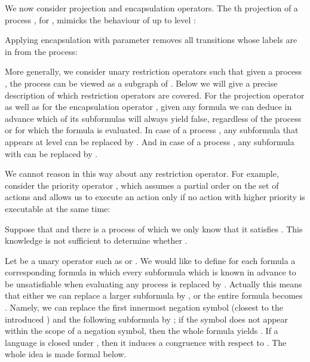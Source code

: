 \documentclass{eptcs}
\begin{document}
We now consider projection and encapsulation operators. The th projection of a process , for , mimicks the behaviour of  up to level :
\begin{center}

\end{center}
Applying encapsulation with parameter  removes all transitions whose labels are in  from the process:
\begin{center}

\end{center}
More generally, we consider unary restriction operators  such that given a process , the process  can be viewed as a subgraph of . Below we will give a precise description of which restriction operators are covered. For the projection operator  as well as for the encapsulation operator , given any  formula we can deduce in advance which of its subformulas  will always yield false, regardless of the process  or  for which the  formula is evaluated. In case of a process , any subformula  that appears at level  can be replaced by . And in case of a process , any subformula  with  can be replaced by .

We cannot reason in this way about any restriction operator. For example, consider the priority operator , which assumes a partial order  on the set of actions and allows us to execute an action only if no action with higher priority is executable at the same time:
\begin{center}

\end{center}
Suppose that  and there is a process  of which we only know that it satisfies . This knowledge is not sufficient to determine whether .

Let  be a unary operator such as  or . We would like to define for each formula  a corresponding formula  in which every subformula  which is known in advance to be unsatisfiable when evaluating any process  is replaced by . Actually this means that either we can replace a larger subformula by , or the entire formula becomes . Namely, we can replace the first innermost negation symbol (closest to the introduced ) and the following subformula by ; if the  symbol does not appear within the scope of a negation symbol, then the whole formula yields . If a language  is closed under , then it induces a congruence with respect to . The whole idea is made formal below.
\end{document}
